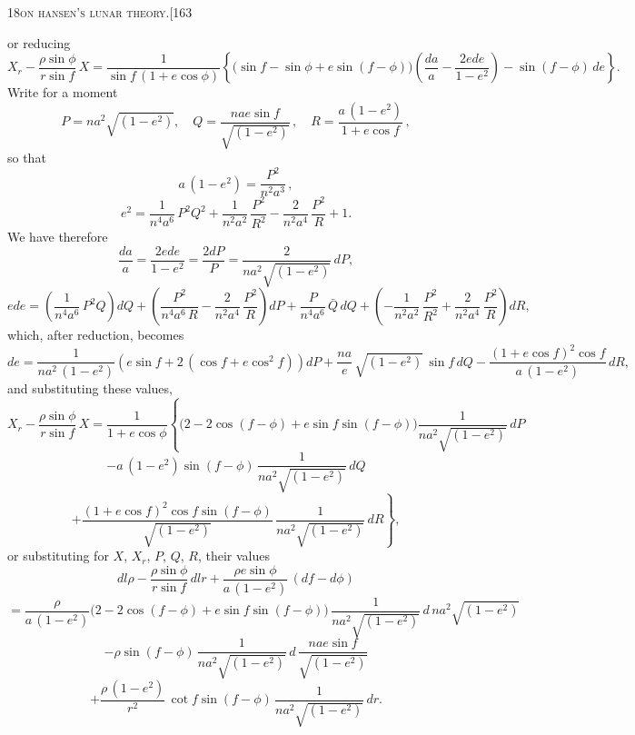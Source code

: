 \documentclass[11pt]{article}
\begin{document}
\newpage

\begin{center}
\small\textsc{18}\hfill\textsc{on hansen's lunar theory.}\hfill[163
\end{center}

\medskip

\noindent or reducing
\[
X_{r} - \frac{\rho\sin\phi}{r\sin f}\,X = \frac{1}{\sin f\,(1 + e\cos\phi)}\!\left\{\!\bigl(\sin f - \sin\phi + e\sin(f - \phi)\bigr)\!\left(\frac{da}{a} - \frac{2ede}{1 - e^{2}}\right) - \sin(f - \phi)\,de\right\}.
\]
Write for a moment
\[
P = na^{2}\sqrt{(1-e^{2})},\quad Q = \frac{nae\sin f}{\sqrt{(1-e^{2})}}\,,\quad R = \frac{a\,(1-e^{2})}{1 + e\cos f}\,,
\]
so that
\[
a\,(1-e^{2}) = \frac{P^{2}}{n^{2}a^{3}}\,,
\]
\[
e^{2} = \frac{1}{n^{4}a^{6}}\,P^{2}Q^{2} + \frac{1}{n^{2}a^{2}}\,\frac{P^{2}}{R^{2}} - \frac{2}{n^{2}a^{4}}\,\frac{P^{2}}{R} + 1.
\]
We have therefore
\[
\frac{da}{a} = \frac{2ede}{1 - e^{2}} = \frac{2dP}{P} = \frac{2}{na^{2}\sqrt{(1-e^{2})}}\,dP,
\]
\[
ede = \left(\frac{1}{n^{4}a^{6}}\,P^{2}Q\right)dQ + \left(\frac{P^{2}}{n^{4}a^{6}\,R} - \frac{2}{n^{2}a^{4}}\,\frac{P^{2}}{R}\right)dP + \frac{P}{n^{4}a^{6}}\,\bar{Q}\,dQ + \left(-\frac{1}{n^{2}a^{2}}\,\frac{P^{2}}{R^{2}} + \frac{2}{n^{2}a^{4}}\,\frac{P^{2}}{R}\right)dR,
\]
which, after reduction, becomes
\[
de = \frac{1}{na^{2}\,(1-e^{2})}\!\left(e\sin f + 2\,(\cos f + e\cos^{2}f)\right)dP + \frac{na}{e}\,\sqrt{(1-e^{2})}\,\sin f\,dQ - \frac{(1 + e\cos f)^{2}\cos f}{a\,(1-e^{2})}\,dR,
\]
and substituting these values,
\[
X_{r} - \frac{\rho\sin\phi}{r\sin f}\,X = \frac{1}{1 + e\cos\phi}\!\left\{\!\bigl(2 - 2\cos(f - \phi) + e\sin f\sin(f - \phi)\bigr)\!\frac{1}{na^{2}\sqrt{(1-e^{2})}}\,dP\right.
\]
\[
- a\,(1-e^{2})\sin(f - \phi)\,\frac{1}{na^{2}\sqrt{(1-e^{2})}}\,dQ
\]
\[
\left.+ \frac{(1 + e\cos f)^{2}\cos f\sin(f - \phi)}{\sqrt{(1-e^{2})}}\,\frac{1}{na^{2}\sqrt{(1-e^{2})}}\,dR\right\},
\]
or substituting for $X$, $X_{r}$, $P$, $Q$, $R$, their values
\[
dl\rho - \frac{\rho\sin\phi}{r\sin f}\,dlr + \frac{\rho e\sin\phi}{a\,(1-e^{2})}\,(df - d\phi)
\]
\[
= \frac{\rho}{a\,(1 - e^{2})}\!\bigl(2 - 2\cos(f - \phi) + e\sin f\sin(f - \phi)\bigr)\,\frac{1}{na^{2}\sqrt{(1-e^{2})}}\,d\,na^{2}\sqrt{(1-e^{2})}
\]
\[
- \rho\sin(f - \phi)\,\frac{1}{na^{2}\sqrt{(1-e^{2})}}\,d\,\frac{nae\sin f}{\sqrt{(1-e^{2})}}
\]
\[
+ \frac{\rho\,(1-e^{2})}{r^{2}}\,\cot f\sin(f - \phi)\,\frac{1}{na^{2}\sqrt{(1-e^{2})}}\,dr.
\]
\end{document}
